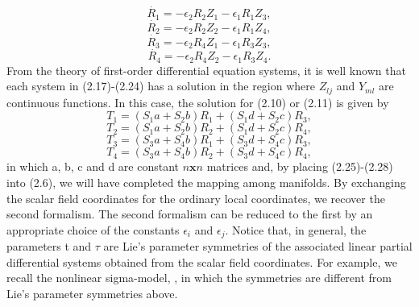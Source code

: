 \begin{equation}
 \dot{R_1}=-\epsilon_{2}R_{2}Z_{1}-\epsilon_{1}R_{1}Z_{3},
\end{equation}
\begin{equation}
 \dot{R_2}=-\epsilon_{2}R_{2}Z_{2}-\epsilon_{1}R_{1}Z_{4},
\end{equation}
\begin{equation}
 \dot{R_3}=-\epsilon_{2}R_{4}Z_{1}-\epsilon_{1}R_{3}Z_{3},
\end{equation}
\begin{equation}
 \dot{R_4}=-\epsilon_{2}R_{4}Z_{2}-\epsilon_{1}R_{3}Z_{4}.
\end{equation}
From the theory of first-order differential equation systems,
it is well known that each system in (2.17)-(2.24) has a solution in the
region where $Z_{lj}$ and $Y_{ml}$ are continuous functions. In
this case, the solution for (2.10) or (2.11) is given by
\begin{equation}
 {T_1}=(S_{1}a+S_{2}b)R_{1}+(S_{1}d+S_{2}c)R_{3},
\end{equation}
\begin{equation}
{T_2}=(S_{1}a+S_{2}b)R_{2}+(S_{1}d+S_{2}c)R_{4},
\end{equation}
\begin{equation}
{T_3}=(S_{3}a+S_{4}b)R_{1}+(S_{3}d+S_{4}c)R_{3},
\end{equation}
\begin{equation}
{T_4}=(S_{3}a+S_{4}b)R_{2}+(S_{3}d+S_{4}c)R_{4},
\end{equation}
\newpage
in which a, b, c and d are constant $n \textbf{x}n$ matrices and, by placing
(2.25)-(2.28) into (2.6), we will have completed the mapping among
manifolds.
\newline
By exchanging the scalar field coordinates for the ordinary local
coordinates, we recover the second formalism. The second formalism can be
reduced to the first by an appropriate choice of the constants
$\epsilon_{i}$ and $\epsilon_{j}$.
\newline
Notice that, in general, the parameters t and $\tau$ are
Lie's parameter symmetries of the associated linear partial
differential systems obtained from the scalar field coordinates.
For example, we recall the nonlinear sigma-model, \cite{3}, in which
the symmetries are different from Lie's parameter symmetries above.
\newpage
